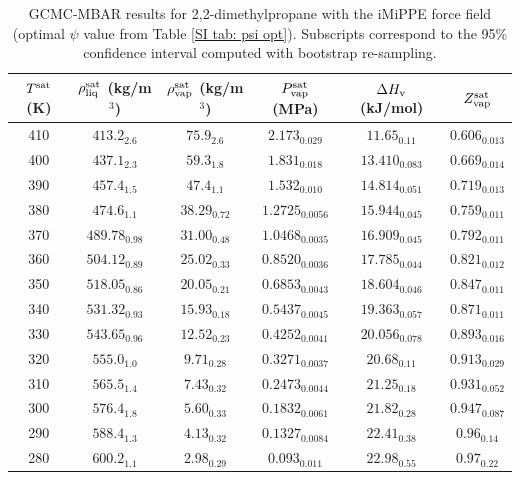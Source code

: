 \documentclass[journal=jctc,manuscript=article]{achemso}
\begin{document}
\begin{table}[htb!]
	\caption{GCMC-MBAR results for 2,2-dimethylpropane with the iMiPPE force field (optimal $\psi$ value from Table \ref{SI tab: psi opt}). Subscripts correspond to the 95\% confidence interval computed with bootstrap re-sampling.}
	\begin{center}
		\begin{tabular}{|c|c|c|c|c|c|}
			\hline
			$T^{\rm sat}$ (K) & $\rho_{\rm liq}^{\rm sat}$ (kg/m$^3$) & $\rho_{\rm vap}^{\rm sat}$ (kg/m$^3$) & $P_{\rm vap}^{\rm sat}$ (MPa) & $\Delta H_{\rm v}$ (kJ/mol) & $Z_{\rm vap}^{\rm sat}$ \\ \hline
			410 & $413.2_{2.6}$ & $75.9_{2.6}$ & $2.173_{0.029}$ & $11.65_{0.11}$ & $0.606_{0.013}$ \\
			400 & $437.1_{2.3}$ & $59.3_{1.8}$ & $1.831_{0.018}$ & $13.410_{0.083}$ & $0.669_{0.014}$ \\
			390 & $457.4_{1.5}$ & $47.4_{1.1}$ & $1.532_{0.010}$ & $14.814_{0.051}$ & $0.719_{0.013}$ \\
			380 & $474.6_{1.1}$ & $38.29_{0.72}$ & $1.2725_{0.0056}$ & $15.944_{0.045}$ & $0.759_{0.011}$ \\
			370 & $489.78_{0.98}$ & $31.00_{0.48}$ & $1.0468_{0.0035}$ & $16.909_{0.045}$ & $0.792_{0.011}$ \\
			360 & $504.12_{0.89}$ & $25.02_{0.33}$ & $0.8520_{0.0036}$ & $17.785_{0.044}$ & $0.821_{0.012}$ \\
			350 & $518.05_{0.86}$ & $20.05_{0.21}$ & $0.6853_{0.0043}$ & $18.604_{0.046}$ & $0.847_{0.011}$ \\
			340 & $531.32_{0.93}$ & $15.93_{0.18}$ & $0.5437_{0.0045}$ & $19.363_{0.057}$ & $0.871_{0.011}$ \\
			330 & $543.65_{0.96}$ & $12.52_{0.23}$ & $0.4252_{0.0041}$ & $20.056_{0.078}$ & $0.893_{0.016}$ \\
			320 & $555.0_{1.0}$ & $9.71_{0.28}$ & $0.3271_{0.0037}$ & $20.68_{0.11}$ & $0.913_{0.029}$ \\
			310 & $565.5_{1.4}$ & $7.43_{0.32}$ & $0.2473_{0.0044}$ & $21.25_{0.18}$ & $0.931_{0.052}$ \\
			300 & $576.4_{1.8}$ & $5.60_{0.33}$ & $0.1832_{0.0061}$ & $21.82_{0.28}$ & $0.947_{0.087}$ \\
			290 & $588.4_{1.3}$ & $4.13_{0.32}$ & $0.1327_{0.0084}$ & $22.41_{0.38}$ & $0.96_{0.14}$ \\
			280 & $600.2_{1.1}$ & $2.98_{0.29}$ & $0.093_{0.011}$ & $22.98_{0.55}$ & $0.97_{0.22}$ \\
			\hline
		\end{tabular}
	\end{center}
\end{table}
\end{document}
